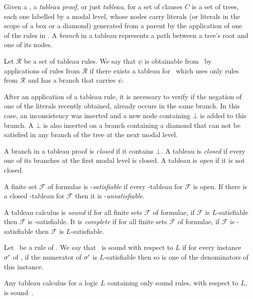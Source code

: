 Given a , a \emph{tableau proof}, or just \emph{tableau}, for a set
of clauses $C$ is a set of trees, each one labelled by a modal level, whose
nodes carry literals (or literals in the scope of a box or a diamond) generated
from a parent by the application of one of the rules in . A
\emph{branch} in a tableau represents a path between a tree's root and one of
its nodes.

\begin{definition}
    Let $\mathcal{R}$ be a set of tableau rules. We say that $\psi$ is obtainable
    from \formula~by applications of rules from $\mathcal{R}$ if there exists a
    tableau for \formula~which uses only rules from $\mathcal{R}$ and has a
    branch that carries $\psi$.
\end{definition}

After an application of a tableau rule, it is necessary to verify if the
negation of one of the literals recently obtained, already occurs in the same
branch. In this case, an inconsistency was inserted and a new node containing
$\bot$ is added to this branch. A $\bot$ is also inserted on a branch containing
a diamond that can not be satisfied in any branch of the tree at the next modal level.

\begin{definition}
    A branch in a tableau proof is \emph{closed} if it contains $\bot$. A
    tableau is \emph{closed} if every one of its branches at the first modal
    level is closed. A tableau is \emph{open} if it is not closed.
\end{definition}

\begin{definition}
    A finite set $\mathcal{F}$ of formulae is -\emph{satisfiable} if
    every -tableau for $\mathcal{F}$ is open. If there is a closed
    -tableau for $\mathcal{F}$ then it is
    -\emph{unsatisfiable}. 
\end{definition}

\begin{definition}
    A tableau calculus  is \emph{sound} if for all finite sets
    $\mathcal{F}$ of formulae, if $\mathcal{F}$ is $L$-satisfiable then
    $\mathcal{F}$ is -satisfiable. It is \emph{complete} if for all
    finite sets $\mathcal{F}$ of formulae, if $\mathcal{F}$ is
    -satisfiable then $\mathcal{F}$ is $L$-satisfiable.
\end{definition}

\begin{definition}
\label{rulecorrectness}
    Let \trule~be a rule of . We say that \trule~is sound with respect
    to $L$ if for every instance $\sigma'$ of \trule, if the numerator of $\sigma'$
    is $L$-satisfiable then so is one of the denominators of this instance.
\end{definition}

Any tableau calculus for a logic $L$ containing only sound rules, with respect
to $L$, is sound~\cite{gore2009clausal}.

